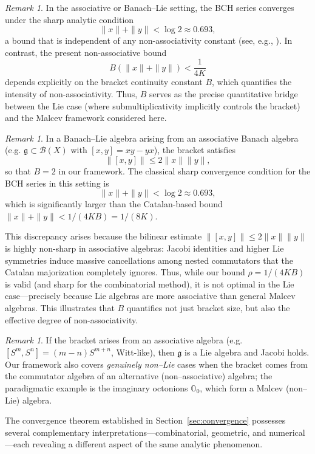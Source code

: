 \documentclass[11pt]{amsart}
\numberwithin{equation}{section}
\theoremstyle{remark}
\newtheorem{remark}[theorem]{Remark}
\begin{document}
\begin{remark}
In the associative or Banach--Lie setting, the BCH series converges under the sharp analytic condition
\[
\|x\| + \|y\| < \log 2 \approx 0.693,
\]
a bound that is independent of any non-associativity constant (see, e.g., \cite{Bourbaki1989,HofmannMorris}).
In contrast, the present non-associative bound
\[
B(\|x\| + \|y\|) < \frac{1}{4K}
\]
depends explicitly on the bracket continuity constant \(B\), which quantifies the intensity of non-associativity.
Thus, \(B\) serves as the precise quantitative bridge between the Lie case (where submultiplicativity implicitly controls the bracket) and the Malcev framework considered here.
\end{remark}

\begin{remark}
In a Banach--Lie algebra arising from an associative Banach algebra (e.g. $\mathfrak{g} \subset \mathcal{B}(X)$ with $[x,y] = xy - yx$), the bracket satisfies
\[
\|[x,y]\| \leq 2\|x\|\|y\|,
\]
so that $B = 2$ in our framework. The classical sharp convergence condition for the BCH series in this setting is
\[
\|x\| + \|y\| < \log 2 \approx 0.693,
\]
which is significantly larger than the Catalan-based bound $\|x\| + \|y\| < 1/(4KB) = 1/(8K)$.

This discrepancy arises because the bilinear estimate $\|[x,y]\| \leq 2\|x\|\|y\|$ is highly non-sharp in associative algebras: Jacobi identities and higher Lie symmetries induce massive cancellations among nested commutators that the Catalan majorization completely ignores. Thus, while our bound $\rho = 1/(4KB)$ is valid (and sharp for the combinatorial method), it is not optimal in the Lie case—precisely because Lie algebras are more associative than general Malcev algebras. This illustrates that $B$ quantifies not just bracket size, but also the effective degree of non-associativity.
\end{remark}

\begin{remark}
If the bracket arises from an associative algebra (e.g. $[S^m,S^n]=(m-n)S^{m+n}$, Witt-like),
then $\mathfrak g$ is a Lie algebra and Jacobi holds.
Our framework also covers \emph{genuinely non--Lie} cases when the bracket comes from the
commutator algebra of an alternative (non--associative) algebra; the paradigmatic example
is the imaginary octonions $\mathbb O_0$, which form a Malcev (non--Lie) algebra.
\end{remark}

The convergence theorem established in Section~\ref{sec:convergence} possesses several complementary interpretations—combinatorial, geometric, and numerical—each revealing a different aspect of the same analytic phenomenon.
\end{document}
